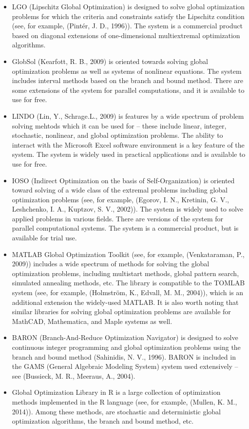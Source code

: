 \documentclass{gOMS2e}
\theoremstyle{plain}%
\theoremstyle{definition}
\theoremstyle{remark}
\begin{document}
\begin{itemize}
\item LGO (Lipschitz Global Optimization) is designed to solve global optimization
problems for which the criteria and constraints satisfy the Lipschitz condition (see, for example, (Pintér, J. D., 1996)).
The system is a commercial product based on diagonal extensions of one-dimensional
multiextremal optimization algorithms.
\item GlobSol (Kearfott, R. B., 2009) is oriented towards solving global optimization problems as well as
systems of nonlinear equations. The system includes interval methods based on the branch and
bound method. There are some extensions of the system for parallel computations, and it is available to use for free.
\item LINDO (Lin, Y., Schrage.L., 2009) is features by a wide spectrum of problem solving mehtods which
it can be used for – these include linear, integer, stochastic, nonlinear, and global
optimization problems. The ability to interact with the Microsoft Excel software
environment is a key feature of the system. The system is widely used in practical
applications and is available to use for free.
\item IOSO (Indirect Optimization on the basis of Self-Organization) is oriented
toward solving of a wide class of the extremal problems including global optimization
problems (see, for example, (Egorov, I. N., Kretinin, G. V., Leshchenko, I. A., Kuptzov, S. V., 2002)). The system is widely used to
solve applied problems in various fields. There are versions of the system for parallel
computational systems. The system is a commercial product, but is available for trial use.
\item MATLAB Global Optimization Toolkit (see, for example, (Venkataraman, P., 2009)) includes a wide spectrum
of methods for solving the global optimization problems, including multistart methods,
global pattern search, simulated annealing methods, etc. The library is compatible to the
TOMLAB system (see, for example, (Holmström, K., Edvall, M. M., 2004)), which is an additional extension the widely-used MATLAB.
It is also worth noting that similar libraries for solving global optimization problems are
available for MathCAD, Mathematica, and Maple systems as well.
\item BARON (Branch-And-Reduce Optimization Navigator) is designed to solve continuous
integer programming and global optimization problems using the branch and bound method (Sahinidis, N. V., 1996).
BARON is included in the GAMS (General Algebraic Modeling System) system used extensively – see (Bussieck, M. R., Meeraus, A., 2004).
\item Global Optimization Library in R is a large collection of optimization methods
implemented in the R language (see, for example, (Mullen, K. M., 2014)). Among these methods, are stochastic and deterministic global optimization algorithms,
the branch and bound method, etc.
\end{itemize}
\end{document}
